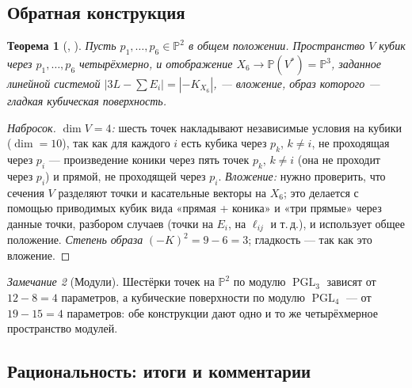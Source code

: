 \documentclass[11pt,a4paper]{article}
\theoremstyle{plain}
\newtheorem{theorem}{Теорема}[section]
\theoremstyle{definition}
\theoremstyle{remark}
\newtheorem{remark}[theorem]{Замечание}
\newcommand{\PP}{\mathbb{P}}
\DeclareMathOperator{\PGL}{PGL}
\begin{document}
\subsection{Обратная конструкция}

\begin{theorem}[{\cite[V.4.6]{Ha}, \cite[IV]{Be}}]\label{thm:converse}
Пусть $p_1,\dots,p_6\in\PP^2$ в общем положении. Пространство $V$ кубик через $p_1,\dots,p_6$ четырёхмерно, и
отображение $X_6\to\PP(V^*)=\PP^3$, заданное линейной системой $|3L-\sum E_i|=|-K_{X_6}|$, --- вложение, образ
которого --- гладкая кубическая поверхность.
\end{theorem}
\begin{proof}[Набросок]
\emph{$\dim V=4$:} шесть точек накладывают независимые условия на кубики ($\dim=10$), так как для каждого $i$ есть
кубика через $p_k$, $k\ne i$, не проходящая через $p_i$ --- произведение коники через пять точек $p_k$, $k\ne i$
(она не проходит через $p_i$) и прямой, не проходящей через $p_i$. \emph{Вложение:} нужно проверить, что сечения
$V$ разделяют точки и касательные векторы на $X_6$; это делается с помощью приводимых кубик вида «прямая + коника»
и «три прямые» через данные точки, разбором случаев (точки на $E_i$, на $\ell_{ij}$ и т.\,д.), и использует общее
положение. \emph{Степень образа} $(-K)^2=9-6=3$; гладкость --- так как это вложение.
\end{proof}

\begin{remark}[Модули]
Шестёрки точек на $\PP^2$ по модулю $\PGL_3$ зависят от $12-8=4$ параметров, а кубические поверхности по модулю
$\PGL_4$ --- от $19-15=4$ параметров: обе конструкции дают одно и то же четырёхмерное пространство модулей.
\end{remark}

\subsection{Рациональность: итоги и комментарии}
\end{document}
